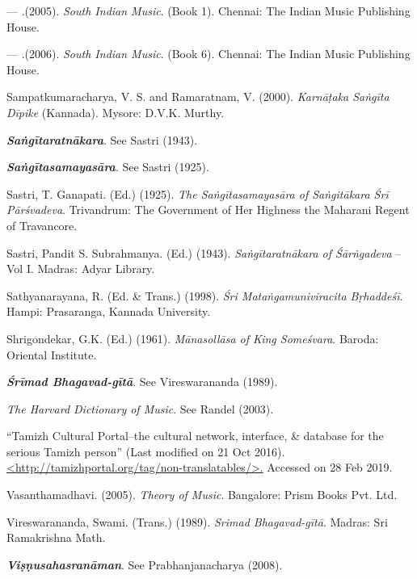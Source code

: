 \begin{thebibliography}{99}
  — .(2005). \textit{South Indian Music}. (Book 1). Chennai: The Indian Music Publishing House.

  — .(2006). \textit{South Indian Music}. (Book 6). Chennai: The Indian Music Publishing House.

  Sampatkumaracharya, V. S. and Ramaratnam, V. (2000). \textit{Karnāṭaka Saṅgīta Dīpike} (Kannada). Mysore: D.V.K. Murthy.

  \textbf{\textit{Saṅgītaratnākara}}. See Sastri (1943).

  \textbf{\textit{Saṅgītasamayasāra}}. See Sastri (1925).

  Sastri, T. Ganapati. (Ed.) (1925). \textit{The Saṅgītasamayasāra of Saṅgitākara Śrī Pārśvadeva}. Trivandrum: The Government of Her Highness the Maharani Regent of Travancore. 

  Sastri, Pandit S. Subrahmanya. (Ed.) (1943). \textit{Saṅgītaratnākara of Śārṅgadeva} – Vol I. Madras: Adyar Library.

  Sathyanarayana, R. (Ed. \& Trans.) (1998). \textit{Śri Mataṅgamuniviracita Bṛhaddeśī}. Hampi: Prasaranga, Kannada University.

  Shrigondekar, G.K. (Ed.) (1961). \textit{Mānasollāsa of King Someśvara}. Baroda: Oriental Institute.

  \textbf{\textit{Śrīmad Bhagavad-gītā}}. See Vireswarananda (1989).

  \textit{The Harvard Dictionary of Music}. See Randel (2003).

  “Tamizh Cultural Portal–the cultural network, interface, \& database for the serious Tamizh person” (Last modified on 21 Oct 2016). \url{<http://tamizhportal.org/tag/non-translatables/>.} Accessed on 28 Feb 2019.

  Vasanthamadhavi. (2005). \textit{Theory of Music}. Bangalore: Prism Books Pvt. Ltd.

  Vireswarananda, Swami. (Trans.) (1989). \textit{Srimad Bhagavad-gītā}. Madras: Sri Ramakrishna Math.

  \textbf{\textit{Viṣṇusahasranāman}}. See Prabhanjanacharya (2008).

 \end{thebibliography}

